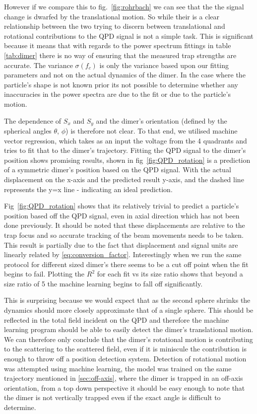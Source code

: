 However if we compare this to fig.~\ref{fig:rohrbach} we can see 
that the the signal change is dwarfed by the translational motion. 
So while their is a clear relationship between the two trying to
discern between translational and rotational contributions to the
QPD signal is not a simple task. This is significant because it 
means that with regards to the power spectrum fittings in table 
\ref{tab:dimer} there is no way of ensuring that the measured 
trap strengths are accurate. The variance $\sigma(f_c)$ is only 
the variance based upon our fitting parameters and not on the 
actual dynamics of the dimer. In the case where the particle's
shape is not known prior its not possible to determine whether 
any inaccuracies in the power spectra are due to the fit or due
to the particle's motion.

The dependence of $S_x$ and $S_y$ and the dimer's orientation
(defined by the spherical angles $\theta$, $\phi$) is therefore
not clear. To that end, we utilised machine vector regression,
which takes as an input the voltage from the 4 quadrants and 
tries to fit that to the dimer's trajectory. Fitting the QPD
signal to the dimer's position shows promising results, shown in
fig~\ref{fig:QPD_rotation} is a prediction of a symmetric dimer's 
position based on the QPD signal. With the actual displacement 
on the x-axis and the predicted result y-axis, and the dashed 
line represents the y=x line - indicating an ideal prediction. 

Fig~\ref{fig:QPD_rotation} shows that its relatively trivial 
to predict a particle's position based off the QPD signal, even 
in axial direction which has not been done previously. It should 
be noted that these displacements are relative to the trap focus 
and so accurate tracking of the beam movements needs to be taken. 
This result is partially due to the fact that displacement and 
signal units are linearly related by \eqref{eq:conversion_factor}. Interestingly when we run the same protocol for different sized 
dimer's there seems to be a cut off point when the fit begins to 
fail. Plotting the $R^2$ for each fit vs its size ratio shows 
that beyond a size ratio of 5 the machine learning begins to fall 
off significantly. 

This is surprising because we would expect that as the second 
sphere shrinks the dynamics should more closely approximate that 
of a single sphere. This should be reflected in the total field
incident on the QPD and therefore the machine learning program 
should be able to easily detect the dimer's translational motion.
We can therefore only conclude that the dimer's rotational motion
is contributing to the scattering to the scattered field, even if
it is miniscule the contribution is enough to throw off a 
position detection system. Detection of rotational motion was 
attempted using machine learning, the model was trained on the 
same trajectory mentioned in \ref{sec:off-axis}, where the dimer 
is trapped in an off-axis orientation, from a top down perspective
it should be easy enough to note that the dimer is not vertically 
trapped even if the exact angle is difficult to determine. 

